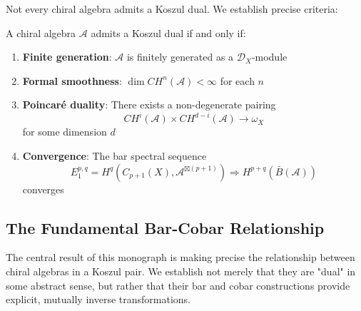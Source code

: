 Not every chiral algebra admits a Koszul dual. We establish precise criteria:

\begin{theorem}
A chiral algebra $\mathcal{A}$ admits a Koszul dual if and only if:
\begin{enumerate}
\item \textbf{Finite generation}: $\mathcal{A}$ is finitely generated as a $\mathcal{D}_X$-module
\item \textbf{Formal smoothness}: $\dim CH^n(\mathcal{A}) < \infty$ for each $n$
\item \textbf{Poincaré duality}: There exists a non-degenerate pairing
   $$CH^i(\mathcal{A}) \times CH^{d-i}(\mathcal{A}) \to \omega_X$$
   for some dimension $d$
\item \textbf{Convergence}: The bar spectral sequence 
   $$E_1^{p,q} = H^q(C_{p+1}(X), \mathcal{A}^{\boxtimes(p+1)}) \Rightarrow H^{p+q}(\bar{B}(\mathcal{A}))$$
   converges
\end{enumerate}
\end{theorem}


\subsection{The Fundamental Bar-Cobar Relationship}

The central result of this monograph is making precise the relationship between chiral algebras in a Koszul pair. We establish not merely that they are "dual" in some abstract sense, but rather that their bar and cobar constructions provide explicit, mutually inverse transformations.

